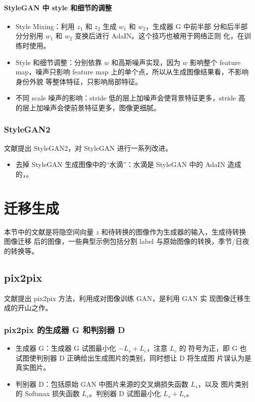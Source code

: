 \paragraph{StyleGAN 中 style 和细节的调整}
\begin{itemize}
  \item Style Mixing：利用 $z_1$ 和 $z_2$ 生成 $w_1$ 和 $w_2$，生成器 G 中前半部
    分和后半部分分别用 $w_1$ 和 $w_2$ 变换后进行 AdaIN。这个技巧也被用于网络正则
    化，在训练时使用。
  \item Style 和细节调整：分别依靠 $w$ 和高斯噪声实现，因为 $w$ 影响整个 feature
    map，噪声只影响 feature map 上的单个点，所以从生成图像结果看，不影响身份外貌
    等整体特征，只影响局部特征。
  \item 不同 scale 噪声的影响：stride 低的层上加噪声会使背景特征更多，stride 高
    的层上加噪声会使前景特征更多，图像更细腻。
\end{itemize}

\subsubsection{StyleGAN2}
文献提出 StyleGAN2，对 StyleGAN 进行一系列改进。

\begin{itemize}
  \item 去掉 StyleGAN 生成图像中的“水滴”：水滴是 StyleGAN 中的 AdaIN 造成的，。
\end{itemize}

\section{迁移生成}
本节中的文献是将隐空间向量 $z$ 和待转换的图像作为生成器的输入，生成待转换图像迁移
后的图像，一些典型示例包括分割 label 与原始图像的转换，季节/日夜的转换等。

\subsection{pix2pix}
文献提出 pix2pix 方法，利用成对图像训练 GAN，是利用 GAN 实
现图像迁移生成的开山之作。

\subsubsection{pix2pix 的生成器 G 和判别器 D}
\begin{itemize}
  \item 生成器 G：生成器 G 试图最小化 $-L_{s} + L_{c}$，注意 $L_{c}$ 的
    符号为正，即 G 也试图使判别器 D 正确给出生成图片的类别，同时想让 D 将生成图
    片误认为是真实图片。
  \item 判别器 D：包括原始 GAN 中图片来源的交叉熵损失函数 $L_{s}$，以及
    图片类别的 Softmax 损失函数 $L_{c}$。判别器 D 试图最小化 $L_{s} + L_{c}$。
\end{itemize}

